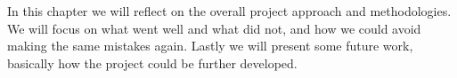 In this chapter we will reflect on the overall project approach and methodologies. We will focus on what went well and what did not, and how we could avoid making the same mistakes again. Lastly we will present some future work, basically how the project could be further developed.